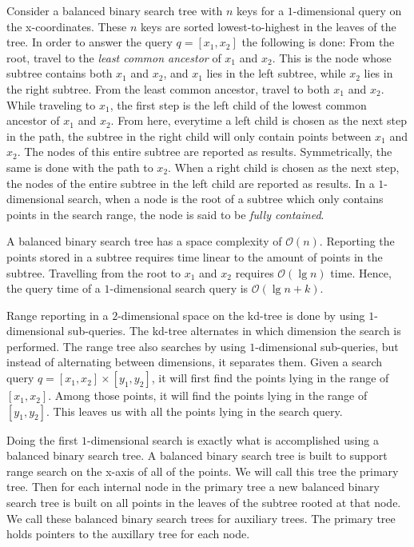 Consider a balanced binary search tree with $n$ keys for a $1$-dimensional query on the x-coordinates. These $n$ keys are sorted lowest-to-highest in the leaves of the tree. In order to answer the query $q = [x_1, x_2]$ the following is done: From the root, travel to the \emph{least common ancestor} of $x_1$ and $x_2$. This is the node whose subtree contains both $x_1$ and $x_2$, and $x_1$ lies in the left subtree, while $x_2$ lies in the right subtree. From the least common ancestor, travel to both $x_1$ and $x_2$. While traveling to $x_1$, the first step is the left child of the lowest common ancestor of $x_1$ and $x_2$. From here, everytime a left child is chosen as the next step in the path, the subtree in the right child will only contain points between $x_1$ and $x_2$. The nodes of this entire subtree are reported as results. Symmetrically, the same is done with the path to $x_2$. When a right child is chosen as the next step, the nodes of the entire subtree in the left child are reported as results. In a $1$-dimensional search, when a node is the root of a subtree which only contains points in the search range, the node is said to be \emph{fully contained}.

A balanced binary search tree has a space complexity of $\mathcal{O}(n)$. Reporting the points stored in a subtree requires time linear to the amount of points in the subtree. Travelling from the root to $x_1$ and $x_2$ requires $\mathcal{O}(\lg n)$ time. Hence, the query time of a $1$-dimensional search query is $\mathcal{O}(\lg n + k)$.

Range reporting in a $2$-dimensional space on the kd-tree is done by using $1$-dimensional sub-queries. The kd-tree alternates in which dimension the search is performed. The range tree also searches by using $1$-dimensional sub-queries, but instead of alternating between dimensions, it separates them. Given a search query $q = [x_1, x_2] \times [y_1, y_2]$, it will first find the points lying in the range of $[x_1, x_2]$. Among those points, it will find the points lying in the range of $[y_1, y_2]$. This leaves us with all the points lying in the search query.

Doing the first $1$-dimensional search is exactly what is accomplished using a balanced binary search tree. A balanced binary search tree is built to support range search on the x-axis of all of the points. We will call this tree the primary tree. Then for each internal node in the primary tree a new balanced binary search tree is built on all points in the leaves of the subtree rooted at that node. We call these balanced binary search trees for auxiliary trees. The primary tree holds pointers to the auxillary tree for each node.

